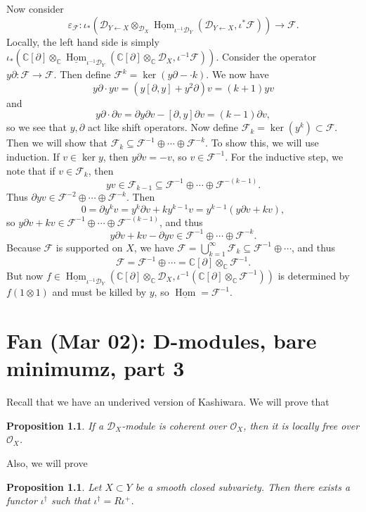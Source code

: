 \documentclass[leqno, openany]{memoir}
\newtheorem{prop}[thm]{Proposition}
\theoremstyle{definition}
\theoremstyle{remark}
\theoremstyle{plain}
\theoremstyle{definition}
\theoremstyle{remark}
\newcommand{\C}{\mathbb{C}}
\newcommand{\ep}{\varepsilon}
\newcommand{\mc}[1]{\mathcal{#1}}
\newcommand{\ul}[1]{\underline{#1}}
\DeclareMathOperator{\Hom}{Hom}
\begin{document}
    Now consider 
    \[\ep_{\mc{F}} \colon \iota_* (\mc{D}_{Y \gets X} \otimes_{\mc{D}_X} \ul{\Hom}_{\iota^{-1} \mc{D}_Y}(\mc{D}_{Y \gets X}, \iota^* \mc{F})) \to \mc{F}. \] 
    Locally, the left hand side is simply $\iota_* (\C[\partial] \otimes_{\C} \ul{\Hom}_{\iota^{-1} \mc{D}_Y}(\C[\partial] \otimes_{\C} \mc{D}_X, \iota^{-1} \mc{F}))$. Consider the operator $y \partial \colon \mc{F} \to \mc{F}$. Then define $\mc{F}^k = \ker(y \partial - \cdot k)$. We now have
    \[ y \partial \cdot y v = (y [\partial, y] + y^2 \partial) v = (k+1) yv \]
    and
    \[ y \partial \cdot \partial v = \partial y \partial v - [\partial, y] \partial v = (k-1) \partial v, \]
    so we see that $y, \partial$ act like shift operators. Now define $\mc{F}_k = \ker(y^k) \subset \mc{F}$. Then we will show that $\mc{F}_k \subseteq \mc{F}^{-1} \oplus \cdots \oplus \mc{F}^{-k}$. To show this, we will use induction. If $v \in \ker y$, then $y \partial v = -v$, so $v \in \mc{F}^{-1}$. For the inductive step, we note that if $v \in \mc{F}_k$, then
    \[ yv \in \mc{F}_{k-1} \subseteq \mc{F}^{-1} \oplus \cdots \oplus \mc{F}^{-(k-1)}. \]
    Thus $\partial yv \in \mc{F}^{-2} \oplus \cdots \oplus \mc{F}^{-k}$. Then
    \[ 0 = \partial y^k v = y^k \partial v + k y^{k-1} v = y^{k-1}(y \partial v + kv), \]
    so $y \partial v + kv \in \mc{F}^{-1} \oplus \cdots \oplus \mc{F}^{-(k-1)}$, and thus
    \[ y \partial v + kv - \partial yv \in \mc{F}^{-1} \oplus \cdots \oplus \mc{F}^{-k}. \]
    Because $\mc{F}$ is supported on $X$, we have $\mc{F} = \bigcup_{k=1}^{\infty} \mc{F}_k \subseteq \mc{F}^{-1} \oplus \cdots$, and thus 
    \[\mc{F} = \mc{F}^{-1} \oplus \cdots = \C[\partial] \otimes_{\C} \mc{F}^{-1}. \] 
    But now $f \in \ul{\Hom}_{\iota^{-1} \mc{D}_Y} (\C[\partial] \otimes_{\C} \mc{D}_X, \iota^{-1}(\C[\partial] \otimes_{\C} \mc{F}^{-1}))$ is determined by $f(1 \otimes 1)$ and must be killed by $y$, so $\ul{\Hom} = \mc{F}^{-1}$.

\chapter{Fan (Mar 02): D-modules, bare minimumz, part 3}%

Recall that we have an underived version of Kashiwara. We will prove that
\begin{prop}
    If a $\mc{D}_X$-module is coherent over $\mc{O}_X$, then it is locally free over $\mc{O}_X$.
\end{prop}

Also, we will prove
\begin{prop}
    Let $X \subset Y$ be a smooth closed subvariety. Then there exists a functor $\iota^{\dagger}$ such that $\iota^{\dagger} = R \iota^+$.
\end{prop}
\end{document}
